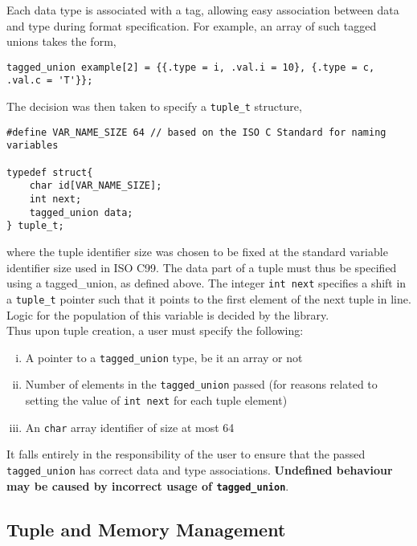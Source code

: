 \documentclass[10pt, a4paper, oneside]{memoir}
\begin{document}
	Each data type is associated with a tag, allowing easy association between data and type during format specification. For example, an array of such tagged unions takes the form,
\begin{verbatim}
tagged_union example[2] = {{.type = i, .val.i = 10}, {.type = c, .val.c = 'T'}};
\end{verbatim}

\newpage

The decision was then taken to specify a \texttt{tuple_t} structure,
\begin{verbatim}
#define VAR_NAME_SIZE 64 // based on the ISO C Standard for naming variables

typedef struct{
	char id[VAR_NAME_SIZE];
	int next;
	tagged_union data;
} tuple_t;
\end{verbatim}
	where the tuple identifier size was chosen to be fixed at the standard variable identifier size used in ISO C99. The data part of a tuple must thus be specified using a tagged\_union, as defined above. The integer \texttt{int next} specifies a shift in a \texttt{tuple_t} pointer such that it points to the first element of the next tuple in line. Logic for the population of this variable is decided by the library.\\

	Thus upon tuple creation, a user must specify the following:
	\begin{enumerate}[i.]
		\item A pointer to a \texttt{tagged_union} type, be it an array or not
		\item Number of elements in the \texttt{tagged_union} passed (for reasons related to setting the value of \texttt{int next} for each tuple element)
		\item An \texttt{char} array identifier of size at most 64
	\end{enumerate}

	It falls entirely in the responsibility of the user to ensure that the passed \texttt{tagged_union} has correct data and type associations. \textbf{Undefined behaviour may be caused by incorrect usage of \texttt{tagged_union}}.
	
	\subsection{Tuple and Memory Management}
\end{document}
